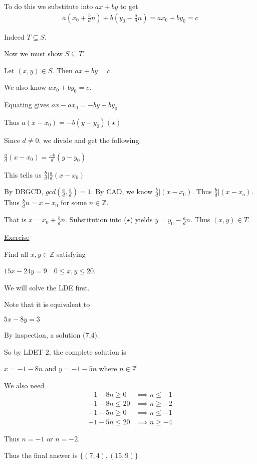 \documentclass{article}
\begin{document}
To do this we substitute into $ax + by$ to get 
\begin{align*}
    a(x_0 + \frac{b}{d}n) + b(y_0-\frac{a}{d}n) = ax_0 + by_0 = c
\end{align*}

Indeed $T \subseteq S$. 

Now we must show $S \subseteq T$. 

Let $(x,y) \in S$. Then $ax + by = c$. 

We also know $ax_0 + by_0 = c$. 

Equating gives $ax-ax_0 = -by + by_0$

Thus $a(x-x_0) = -b(y-y_0) (\star)$

Since $d \ne 0$, we divide and get the following.

$\frac{a}{d}(x-x_0) = \frac{-b}{d}(y-y_0)$

This tells us $\frac{b}{d} \vert \frac{a}{d}(x-x_0)$

By DBGCD, $gcd(\frac{a}{d},\frac{b}{d})=1$. By CAD, we know $\frac{b}{d} \vert (x - x_0)$. Thus $\frac{b}{d} \vert (x-x_o)$. Thus $\frac{b}{d}n = x-x_0$ for some $n \in \mathbb{Z}$. 

That is $x=x_0 + \frac{b}{d}n$. Substitution into ($\star$) yields $y= y_0 - \frac{a}{d}n$. Thus $(x,y) \in T$. 

\underline{Exercise}

Find all $x,y \in \mathbb{Z}$ satisfying

$15x-24y = 9 \quad 0 \le x,y \le 20$. 

We will solve the LDE first.

Note that it is equivalent to 

$5x-8y=3$

By inspection, a solution (7,4). 

So by LDET 2, the complete solution is 

$x = -1 -8n$ and $y=-1-5n$ where $n \in \mathbb{Z}$

We also need 
\begin{align*}
    -1 -8n \ge 0 &\implies n \le -1 \\
    -1 -8n \le 20 &\implies n \ge -2 \\
    -1 -5n \ge 0 &\implies n \le -1 \\
    -1 -5n \le 20 &\implies n \ge -4
\end{align*}

Thus $n = -1$ or $n = -2$. 

Thus the final answer is $\{(7,4),(15,9)\}$
\end{document}
